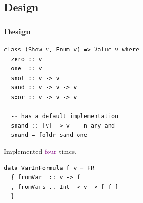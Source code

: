 \documentclass{beamer}
\newcommand{\pub}[1]{\textcolor{purple}{#1}}
\begin{document}
\subsection[Design]{Design}

\begin{frame}[fragile]
  \frametitle{Design}
\begin{verbatim}
class (Show v, Enum v) => Value v where
  zero :: v
  one  :: v
  snot :: v -> v
  sand :: v -> v -> v
  sxor :: v -> v -> v

  -- has a default implementation
  snand :: [v] -> v -- n-ary and
  snand = foldr sand one
\end{verbatim}
  
Implemented \pub{four} times.
\begin{verbatim}
data VarInFormula f v = FR
  { fromVar  :: v -> f
  , fromVars :: Int -> v -> [ f ]
  }
\end{verbatim}

\end{frame}
\end{document}
